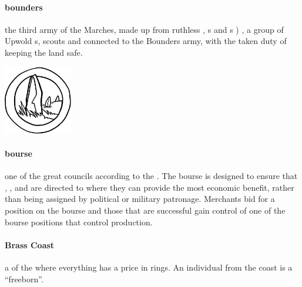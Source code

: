 \paragraph{bounders}  the third army of the Marches, made up from ruthless  , s and s  ) , a group of Upwold s, scouts and  connected to the Bounders army, with the taken duty of keeping the land safe. \begin{center}\includegraphics[width=3cm]{encyclopedia/TheBounders}\end{center}
\paragraph{bourse} one of the great councils according to the . The bourse is designed to ensure that , ,  and  are directed to where they can provide the most economic benefit, rather than being assigned by political or military patronage. Merchants bid for a position on the bourse and those that are successful gain control of one of the bourse positions that control production.
\paragraph{Brass Coast} a  of the  where everything has a price in rings. An individual from the coast is a “freeborn”.

